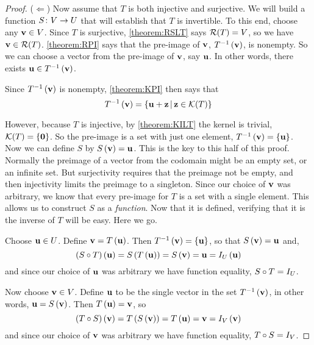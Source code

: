 \documentclass{ximera}
\begin{document}
\begin{theorem}
\begin{proof}
($\Leftarrow$)  Now assume that $T$ is both injective and surjective.  We will build a function $S\colon V\rightarrow U$ that will establish that $T$ is invertible.  To this end, choose any $\mathbf{v}\in V$.  Since $T$ is surjective, \ref{theorem:RSLT} says $\mathcal{R}\!\left(T\right)=V$, so we have $\mathbf{v}\in\mathcal{R}\!\left(T\right)$.  \ref{theorem:RPI} says that the pre-image of $\mathbf{v}$, $T^{-1}\left(\mathbf{v}\right)$, is nonempty.  So we can choose a vector from the pre-image of $\mathbf{v}$, say $\mathbf{u}$.  In other words, there exists $\mathbf{u}\in T^{-1}\left(\mathbf{v}\right)$.



Since $T^{-1}\left(\mathbf{v}\right)$ is nonempty, \ref{theorem:KPI} then says that
\[
T^{-1}\left(\mathbf{v}\right)=\left\lbrace\mathbf{u}+\mathbf{z}\,\middle|\,\mathbf{z}\in\mathcal{K}\!\left(T\right)\right\rbrace
\]




However, because $T$ is injective, by \ref{theorem:KILT} the kernel is trivial, $\mathcal{K}\!\left(T\right)=\left\{\mathbf{0}\right\}$.  So the pre-image is a set with just one element, $T^{-1}\left(\mathbf{v}\right)=\left\{\mathbf{u}\right\}$.  Now we can define $S$ by $S\left(\mathbf{v}\right)=\mathbf{u}$.  This is the key to this half of this proof.  Normally the preimage of a vector from the codomain might be an empty set, or an infinite set.  But surjectivity requires that the preimage not be empty, and then injectivity limits the preimage to a singleton.  Since our choice of $\mathbf{v}$ was arbitrary, we know that every pre-image for $T$ is a set with a single element.  This allows us to construct $S$ as a \textit{function}.  Now that it is defined, verifying that it is the inverse of $T$ will be easy.  Here we go.



Choose $\mathbf{u}\in U$.  Define $\mathbf{v}=T\left(\mathbf{u}\right)$.  Then $T^{-1}\left(\mathbf{v}\right)=\left\{\mathbf{u}\right\}$, so that $S\left(\mathbf{v}\right)=\mathbf{u}$ and,
\[
\left({S}\circ{T}\right)\left(\mathbf{u}\right)
=S\left(T\left(\mathbf{u}\right)\right)
=S\left(\mathbf{v}\right)
=\mathbf{u}
=I_U\left(\mathbf{u}\right)
\]
and since our choice of $\mathbf{u}$ was arbitrary we have function equality, ${S}\circ{T}=I_U$.



Now choose $\mathbf{v}\in V$.  Define $\mathbf{u}$ to be the single vector in the set $T^{-1}\left(\mathbf{v}\right)$, in other words, $\mathbf{u}=S\left(\mathbf{v}\right)$.  Then $T\left(\mathbf{u}\right)=\mathbf{v}$, so
\[
\left({T}\circ{S}\right)\left(\mathbf{v}\right)
=T\left(S\left(\mathbf{v}\right)\right)
=T\left(\mathbf{u}\right)
=\mathbf{v}
=I_V\left(\mathbf{v}\right)
\]
and since our choice of $\mathbf{v}$ was arbitrary we have function equality, ${T}\circ{S}=I_V$.


\end{proof}
\end{theorem}
\end{document}
